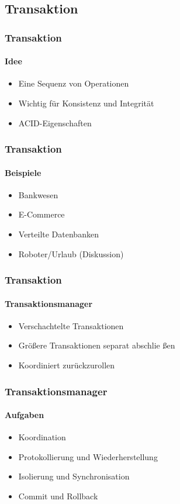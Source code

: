 \subsection{Transaktion}
\begin{frame}
  \frametitle{Transaktion}
  \framesubtitle{Idee}
  \begin{itemize}
    \item Eine Sequenz von Operationen
    \item Wichtig für Konsistenz und Integrität
    \item ACID-Eigenschaften 
  \end{itemize}
\end{frame}
\begin{frame}
  \frametitle{Transaktion}
  \framesubtitle{Beispiele}
  \begin{itemize}
    \item Bankwesen
    \item E-Commerce
    \item Verteilte Datenbanken
    \item Roboter/Urlaub (Diskussion)
  \end{itemize}
\end{frame}
\begin{frame}
  \frametitle{Transaktion}
  \framesubtitle{Transaktionsmanager}
  \begin{itemize}
    \item Verschachtelte Transaktionen 
    \item Größere Transaktionen separat abschlie  ßen
    \item Koordiniert zurückzurollen
  \end{itemize}
\end{frame}

\begin{frame}
  \frametitle{Transaktionsmanager}
  \framesubtitle{Aufgaben}
  \begin{itemize}
    \item Koordination
    \item Protokollierung und Wiederherstellung
    \item Isolierung und Synchronisation
    \item Commit und Rollback
  \end{itemize}
\end{frame}

